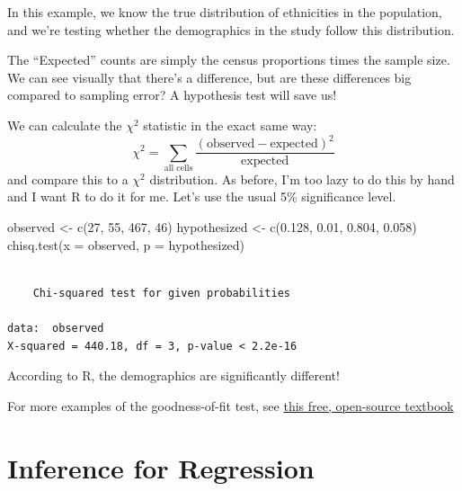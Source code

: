 \documentclass[
  letterpaper,
  DIV=11,
  numbers=noendperiod,
  oneside]{scrreprt}
\newenvironment{Shaded}{\begin{snugshade}}{\end{snugshade}}
\newcommand{\AttributeTok}[1]{\textcolor[rgb]{0.40,0.45,0.13}{#1}}
\newcommand{\DecValTok}[1]{\textcolor[rgb]{0.68,0.00,0.00}{#1}}
\newcommand{\FloatTok}[1]{\textcolor[rgb]{0.68,0.00,0.00}{#1}}
\newcommand{\FunctionTok}[1]{\textcolor[rgb]{0.28,0.35,0.67}{#1}}
\newcommand{\NormalTok}[1]{\textcolor[rgb]{0.00,0.23,0.31}{#1}}
\newcommand{\OtherTok}[1]{\textcolor[rgb]{0.00,0.23,0.31}{#1}}
\begin{document}
In this example, we know the true distribution of ethnicities in the
population, and we're testing whether the demographics in the study
follow this distribution.

The ``Expected'' counts are simply the census proportions times the
sample size. We can see visually that there's a difference, but are
these differences big compared to sampling error? A hypothesis test will
save us!

We can calculate the \(\chi^2\) statistic in the exact same way: \[
\chi^2 = \sum_{\text{all cells}}\frac{(\text{observed} - \text{expected})^2}{\text{expected}}
\] and compare this to a \(\chi^2\) distribution. As before, I'm too
lazy to do this by hand and I want R to do it for me. Let's use the
usual 5\% significance level.

\begin{Shaded}
\begin{Highlighting}[]
\NormalTok{observed }\OtherTok{\textless{}{-}} \FunctionTok{c}\NormalTok{(}\DecValTok{27}\NormalTok{, }\DecValTok{55}\NormalTok{, }\DecValTok{467}\NormalTok{, }\DecValTok{46}\NormalTok{)}
\NormalTok{hypothesized }\OtherTok{\textless{}{-}} \FunctionTok{c}\NormalTok{(}\FloatTok{0.128}\NormalTok{, }\FloatTok{0.01}\NormalTok{, }\FloatTok{0.804}\NormalTok{, }\FloatTok{0.058}\NormalTok{)}
\FunctionTok{chisq.test}\NormalTok{(}\AttributeTok{x =}\NormalTok{ observed, }\AttributeTok{p =}\NormalTok{ hypothesized)}
\end{Highlighting}
\end{Shaded}

\begin{verbatim}

    Chi-squared test for given probabilities

data:  observed
X-squared = 440.18, df = 3, p-value < 2.2e-16
\end{verbatim}

According to R, the demographics are significantly different!

For more examples of the goodness-of-fit test, see
\href{https://stats.libretexts.org/Bookshelves/Introductory_Statistics/Statistics_with_Technology_2e_(Kozak)/11\%3A_Chi-Square_and_ANOVA_Tests/11.02\%3A_Chi-Square_Goodness_of_Fit}{this
free, open-source textbook}

\hypertarget{inference-for-regression}{%
\chapter{Inference for Regression}\label{inference-for-regression}}
\end{document}
